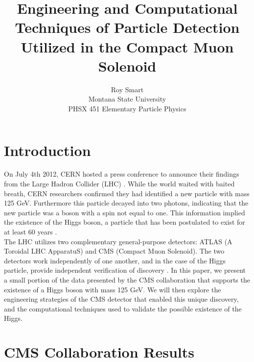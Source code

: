 \documentclass[12pt]{article}
\newcommand{\npar}{\\[0.5cm] \noindent}
\begin{document}
\title{Engineering and Computational Techniques of Particle Detection Utilized in the Compact Muon Solenoid}
\author{Roy Smart \\ Montana State University \\PHSX 451 Elementary Particle Physics}
\maketitle

\section{Introduction}
On July 4th 2012, CERN hosted a press conference to announce their findings from the Large Hadron Collider (LHC) \cite{website:higgs_press}. While the world waited with baited breath, CERN researchers confirmed they had identified a new particle with mass 125 GeV. Furthermore this particle decayed into two photons, indicating that the new particle was a boson with a spin not equal to one\cite{new_higgs}.  This information implied the existence of the Higgs boson, a particle that has been postulated to exist for at least 60 years \cite{higgs_predict}. 
\npar
The LHC utilizes two complementary general-purpose detectors: ATLAS (A Toroidal LHC ApparatuS) and CMS (Compact Muon Solenoid). The two detectors work independently of one another, and in the case of the Higgs particle, provide independent verification of discovery \cite{lhc_combo}. In this paper, we present a small portion of the data presented by the CMS collaboration that supports the existence of a Higgs boson with mass 125 GeV. We will then explore the engineering strategies of the CMS detector that enabled this unique discovery, and the computational techniques used to validate the possible existence of the Higgs.


\section{CMS Collaboration Results}
\end{document}
